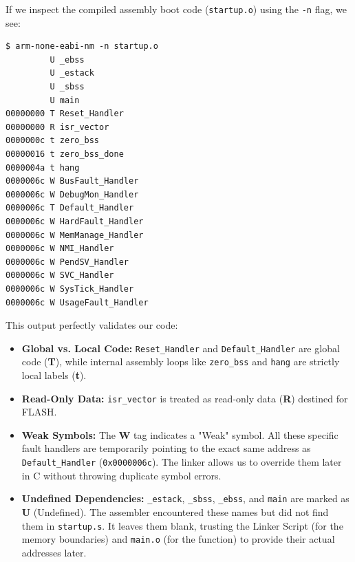 If we inspect the compiled assembly boot code (\texttt{startup.o}) using the \texttt{-n} flag, we see:
\begin{lstlisting}
$ arm-none-eabi-nm -n startup.o
         U _ebss
         U _estack
         U _sbss
         U main
00000000 T Reset_Handler
00000000 R isr_vector
0000000c t zero_bss
00000016 t zero_bss_done
0000004a t hang
0000006c W BusFault_Handler
0000006c W DebugMon_Handler
0000006c T Default_Handler
0000006c W HardFault_Handler
0000006c W MemManage_Handler
0000006c W NMI_Handler
0000006c W PendSV_Handler
0000006c W SVC_Handler
0000006c W SysTick_Handler
0000006c W UsageFault_Handler
\end{lstlisting}
This output perfectly validates our code:
\begin{itemize}
    \item \textbf{Global vs. Local Code:} \texttt{Reset\_Handler} and \texttt{Default\_Handler} are global code (\textbf{T}), while internal assembly loops like \texttt{zero\_bss} and \texttt{hang} are strictly local labels (\textbf{t}).
    \item \textbf{Read-Only Data:} \texttt{isr\_vector} is treated as read-only data (\textbf{R}) destined for FLASH.
    \item \textbf{Weak Symbols:} The \textbf{W} tag indicates a "Weak" symbol. All these specific fault handlers are temporarily pointing to the exact same address as \texttt{Default\_Handler} (\texttt{0x0000006c}). The linker allows us to override them later in C without throwing duplicate symbol errors.
    \item \textbf{Undefined Dependencies:} \texttt{\_estack}, \texttt{\_sbss}, \texttt{\_ebss}, and \texttt{main} are marked as \textbf{U} (Undefined). The assembler encountered these names but did not find them in \texttt{startup.s}. It leaves them blank, trusting the Linker Script (for the memory boundaries) and \texttt{main.o} (for the function) to provide their actual addresses later.
\end{itemize}

